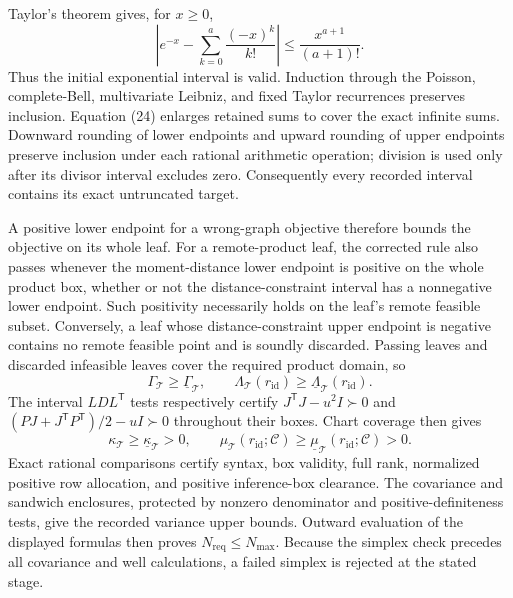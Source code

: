 Taylor's theorem gives, for \(x\geq0\),
\[
 \left|e^{-x}-\sum_{k=0}^{a}\frac{(-x)^k}{k!}\right|
 \leq\frac{x^{a+1}}{(a+1)!}. \tag{26}
\]
Thus the initial exponential interval is valid.  Induction through the Poisson, complete-Bell, multivariate Leibniz, and fixed Taylor recurrences preserves inclusion.  Equation (24) enlarges retained sums to cover the exact infinite sums.  Downward rounding of lower endpoints and upward rounding of upper endpoints preserve inclusion under each rational arithmetic operation; division is used only after its divisor interval excludes zero.  Consequently every recorded interval contains its exact untruncated target.

A positive lower endpoint for a wrong-graph objective therefore bounds the objective on its whole leaf.  For a remote-product leaf, the corrected rule also passes whenever the moment-distance lower endpoint is positive on the whole product box, whether or not the distance-constraint interval has a nonnegative lower endpoint.  Such positivity necessarily holds on the leaf's remote feasible subset.  Conversely, a leaf whose distance-constraint upper endpoint is negative contains no remote feasible point and is soundly discarded.  Passing leaves and discarded infeasible leaves cover the required product domain, so
\[
 \Gamma_{\mathcal T}\geq\underline\Gamma_{\mathcal T},
 \qquad
 \Lambda_{\mathcal T}(r_{\mathrm{id}})
 \geq\underline\Lambda_{\mathcal T}(r_{\mathrm{id}}). \tag{27}
\]
The interval \(LDL^{\mathsf T}\) tests respectively certify
\(J^{\mathsf T}J-u^2I\succ0\) and
\((PJ+J^{\mathsf T}P^{\mathsf T})/2-uI\succ0\) throughout their boxes.  Chart coverage then gives
\[
 \kappa_{\mathcal T}\geq\underline\kappa_{\mathcal T}>0,
 \qquad
 \mu_{\mathcal T}(r_{\mathrm{id}};\mathscr C)
 \geq\underline\mu_{\mathcal T}(r_{\mathrm{id}};\mathscr C)>0. \tag{28}
\]
Exact rational comparisons certify syntax, box validity, full rank, normalized positive row allocation, and positive inference-box clearance.  The covariance and sandwich enclosures, protected by nonzero denominator and positive-definiteness tests, give the recorded variance upper bounds.  Outward evaluation of the displayed formulas then proves \(N_{\mathrm{req}}\leq N_{\max}\).  Because the simplex check precedes all covariance and well calculations, a failed simplex is rejected at the stated stage.

